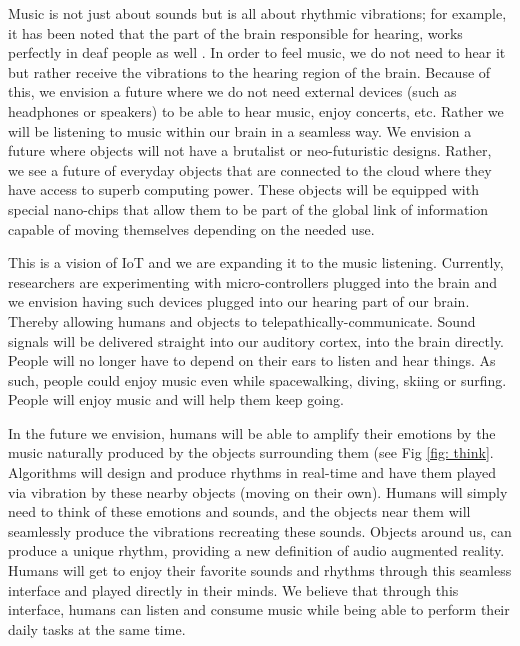 \documentclass[sigchi]{acmart}
\begin{document}
Music is not just about sounds but is all about rhythmic vibrations; for example, it has been noted that the part of the brain responsible for hearing, works perfectly in deaf people as well \cite{abcsciencemusic}. In order to feel music, we do not need to hear it but rather receive the vibrations to the hearing region of the brain. Because of this, we envision a future where we do not need external devices (such as headphones or speakers) to be able to hear music, enjoy concerts, etc. Rather we will be listening to music within our brain in a seamless way. We envision a future where objects will not have a brutalist or neo-futuristic designs. Rather, we see a future of everyday objects that are connected to the cloud \cite{musk2019integrated} where they have access to superb computing power. These objects will be equipped with special nano-chips that allow them to be part of the global link of information capable of moving themselves depending on the needed use.

This is a vision of IoT \cite{weisman2004internet} and we are expanding it to the music listening. Currently, researchers are experimenting with micro-controllers plugged into the brain and we envision having such devices plugged into our hearing part of our brain. Thereby allowing humans and objects to telepathically-communicate. Sound signals will be delivered straight into our auditory cortex, into the brain directly. People will no longer have to depend on their ears to listen and hear things. As such, people could enjoy music even while spacewalking, diving, skiing or surfing. People will enjoy music and will help them keep going. 

In the future we envision, humans will be able to amplify their emotions by the music naturally produced by the objects surrounding them (see Fig \ref{fig: think}. Algorithms will design and produce rhythms in real-time and have them played via vibration by these nearby objects (moving on their own). Humans will simply need to think of these emotions and sounds, and the objects near them will seamlessly produce the vibrations recreating these sounds. Objects around us, can produce a unique rhythm, providing a new definition of audio augmented reality. Humans will get to enjoy their favorite sounds and rhythms through this seamless interface and played directly in their minds. We believe that through this interface, humans can listen and consume music while being able to perform their daily tasks at the same time. 
\end{document}
